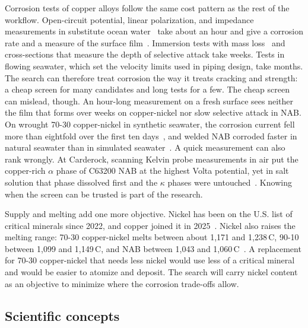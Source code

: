 \documentclass[12pt,letterpaper]{article}
\begin{document}
Corrosion tests of copper alloys follow the same cost pattern as the rest of
the workflow. Open-circuit potential, linear polarization, and impedance
measurements in substitute ocean water~\cite{astmD1141} take about an hour and
give a corrosion rate and a measure of the surface film~\cite{astmG59,astmG102}.
Immersion tests with mass loss~\cite{astmG31,astmG1} and cross-sections that
measure the depth of selective attack take weeks. Tests in flowing seawater,
which set the velocity limits used in piping design, take months. The search
can therefore treat corrosion the way it treats cracking and strength: a cheap
screen for many candidates and long tests for a few. The cheap screen can
mislead, though. An hour-long measurement on a fresh surface sees neither the
film that forms over weeks on copper-nickel nor slow selective attack in NAB.
On wrought 70-30 copper-nickel in synthetic seawater, the corrosion current
fell more than eightfold over the first ten days~\cite{yuan2007}, and welded
NAB corroded faster in natural seawater than in simulated
seawater~\cite{dobson2024b}.
A quick measurement can also rank wrongly.
At Carderock, scanning Kelvin probe measurements in air put the copper-rich $\alpha$ phase of C63200 NAB at the highest Volta potential, yet in salt solution that phase dissolved first and the $\kappa$ phases were untouched~\cite{iannuzzi2017}.
Knowing when the screen can be trusted is part of the research.

Supply and melting add one more objective. Nickel has been on the U.S. list
of critical minerals since 2022, and copper joined it in
2025~\cite{usgs2022,usgs2025}. Nickel also raises the melting range: 70-30
copper-nickel melts between about 1,171 and 1,238\,\textdegree{}C, 90-10
between 1,099 and 1,149\,\textdegree{}C, and NAB between 1,043 and
1,060\,\textdegree{}C~\cite{cdadata}. A replacement for 70-30 copper-nickel
that needs less nickel would use less of a critical mineral and would be
easier to atomize and deposit. The search will carry nickel content as an
objective to minimize where the corrosion trade-offs allow.

\subsection{Scientific concepts}
\label{sec:concepts}
\end{document}
